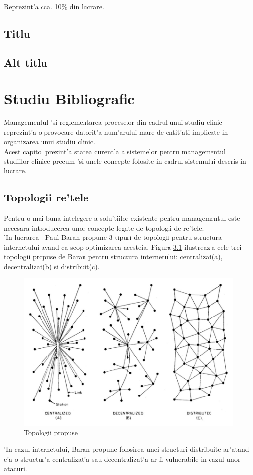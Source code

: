 \documentclass[12pt,a4paper,twoside]{report}
\begin{document}
Reprezint'a cca. 10\% din lucrare.
\section{Titlu}
\section{Alt titlu}


\chapter{Studiu Bibliografic}

	Managementul 'si reglementarea proceselor din cadrul unui studiu clinic reprezint'a o provocare datorit'a num'arului mare de entit'ati implicate in organizarea unui studiu clinic. \\
	Acest capitol prezint'a starea curent'a a sistemelor pentru managementul studiilor clinice precum 'si unele concepte folosite in cadrul sistemului descris in lucrare. 

\section{Topologii re'tele}
	Pentru o mai buna intelegere a solu'tiilor existente pentru managementul este necesara introducerea unor concepte legate de topologii de re'tele.
\\
	'In lucrarea \cite{topologies}, Paul Baran propune 3 tipuri de topologii pentru structura internetului avand ca scop optimizarea acesteia. Figura \ref{fig:topologies} ilustreaz'a cele trei topologii propuse de Baran pentru structura internetului: centralizat(a), decentralizat(b) si distribuit(c).
	
		\begin{figure}[!h]
		\begin{center}
			\includegraphics[scale=0.55]{img/topologies.jpg}
			\caption{Topologii propuse\cite{topologies}}
  			\label{fig:topologies}
  		\end{center}
  		\end{figure}
 	'In cazul internetului, Baran propune folosirea unei structuri distribuite ar'atand c'a o structur'a centralizat'a sau decentralizat'a ar fi vulnerabile in cazul unor atacuri.
 	
\end{document}
